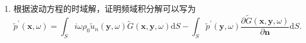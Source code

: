 \begin{enumerate}
    \clearpage

    \item 根据波动方程的时域解，证明频域积分解可以写为
    \begin{equation*}
        \tilde{p}^{\prime}(\boldsymbol{x}, \omega)=\int_{S} i \omega \rho_{0} \tilde{u}_{n}(\boldsymbol{y}, \omega) \tilde{G}(\boldsymbol{x}, \boldsymbol{y}, \omega) \mathrm{d} S-\int_{S} \tilde{p}^{\prime}(\boldsymbol{y}, \omega) \frac{\partial \tilde{G}(\boldsymbol{x}, \boldsymbol{y}, \omega)}{\partial \boldsymbol{n}} \mathrm{d} S .
    \end{equation*}

\end{enumerate}
